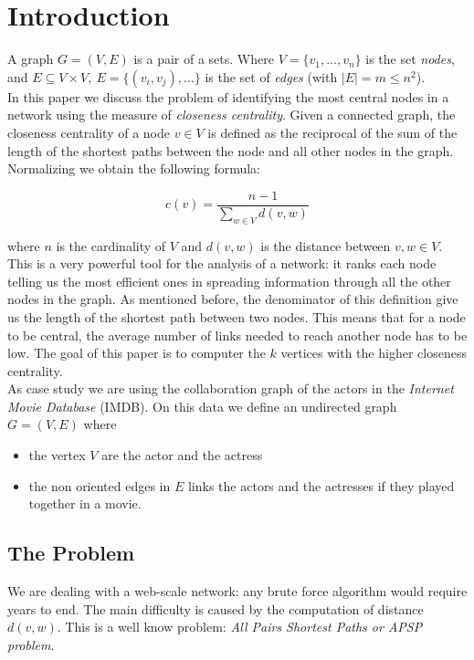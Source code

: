 \section{Introduction}
A graph $G= (V,E)$ is a pair of a sets. Where $V = \{v_1,...,v_n\}$ is the set \emph{nodes}, and $E \subseteq V \times V, ~ E = \{(v_i,v_j),...\}$  is the set of \emph{edges} (with $|E| = m \leq n^2$). \\

In this paper we discuss the problem of identifying the most central nodes in a network using the measure of \emph{closeness centrality}. Given a connected graph, the closeness centrality of a node $v \in V$ is defined as the reciprocal of the sum of the length of the shortest paths between the node and all other nodes in the graph. Normalizing we obtain the following formula:

\begin{equation}\label{closeness}
   c(v) = \frac{n-1}{\displaystyle \sum_{w \in V} d(v,w)}
\end{equation}

where $n$ is the cardinality of $V$ and $d(v,w)$ is the distance between $v,w \in V$. This is a very powerful tool for the analysis of a network: it ranks each node telling us the most efficient ones in spreading information through all the other nodes in the graph. As mentioned before, the denominator of this definition give us the length of the shortest path between two nodes. This means that for a node to be central, the average number of links needed to reach another node has to be low. The goal of this paper is to computer the $k$ vertices with the higher closeness centrality. \\

\noindent As case study we are using the collaboration graph of the actors in the \emph{Internet Movie Database} (IMDB).  On this data we define an undirected graph $G=(V,E)$ where
\begin{itemize}
    \item the vertex $V$ are the actor and the actress
    \item the non oriented edges in $E$ links the actors and the actresses if they played together in a movie.
\end{itemize}

\subsection{The Problem}

We are dealing with a web-scale network: any brute force algorithm would require years to end. The main difficulty is caused by the computation of distance $d(v,w)$. This is a well know problem: \emph{All Pairs Shortest Paths or APSP problem}. \\

